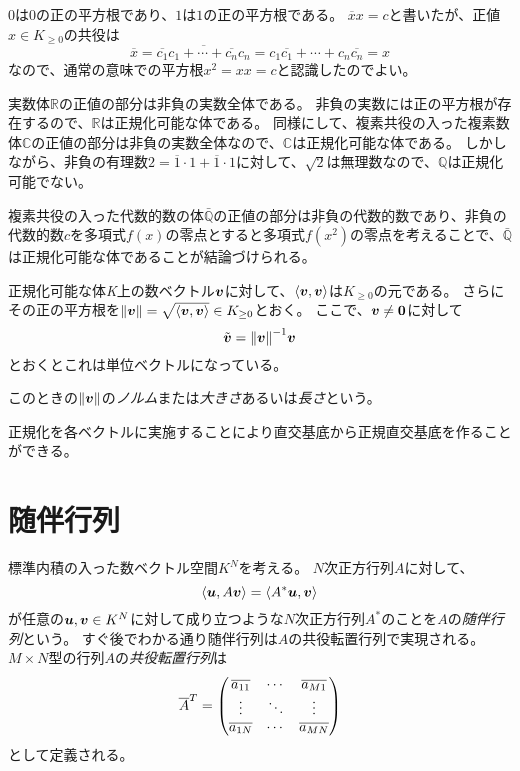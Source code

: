 \begin{remark}
$0$は$0$の正の平方根であり、$1$は$1$の正の平方根である。
$\overline{x}x = c$と書いたが、正値$x \in K_{\ge 0}$の共役は
$$
\overline{x} = \overline{\overline{c_1}c_1+\cdots+\overline{c_n}c_n} = c_1\overline{c_1}+\cdots+c_n\overline{c_n} = x
$$
なので、通常の意味での平方根$x^2 = x x = c$と認識したのでよい。
\end{remark}

\begin{example}
実数体$\mathbb{R}$の正値の部分は非負の実数全体である。
非負の実数には正の平方根が存在するので、$\mathbb{R}$は正規化可能な体である。
同様にして、複素共役の入った複素数体$\mathbb{C}$の正値の部分は非負の実数全体なので、$\mathbb{C}$は正規化可能な体である。
しかしながら、非負の有理数$2 = \overline{1}\cdot 1+\overline{1}\cdot 1$に対して、$\sqrt{2}$は無理数なので、$\mathbb{Q}$は正規化可能でない。
\end{example}

\begin{example}
複素共役の入った代数的数の体$\bar{\mathbb{Q}}$の正値の部分は非負の代数的数であり、非負の代数的数$c$を多項式$f(x)$の零点とすると多項式$f(x^2)$の零点を考えることで、$\bar{\mathbb{Q}}$は正規化可能な体であることが結論づけられる。
\end{example}

\begin{proposition}[正規化]
正規化可能な体\emph{K}上の数ベクトル$\vb*{v}$に対して、$\langle\vb*{v}, \vb*{v}\rangle$は$K_{\ge 0}$の元である。
さらにその正の平方根を$\norm{\vb*{v}} = \sqrt{\langle\vb*{v}, \vb*{v}\rangle} \in K_{\ge 0}$とおく。
ここで、$\vb*{v} \ne \vb*{0}$に対して
$$
\tilde{\vb*{v}} = \norm{\vb*{v}}^{-1}\vb*{v}
$$
とおくとこれは単位ベクトルになっている。
\end{proposition}

このときの$\norm{\vb*{v}}$の\emph{ノルム}または\emph{大きさ}あるいは\emph{長さ}という。

正規化を各ベクトルに実施することにより直交基底から正規直交基底を作ることができる。

\section{随伴行列}

標準内積の入った数ベクトル空間$K^N$を考える。
$N$次正方行列$A$に対して、
$$
\langle\vb*{u}, A\vb*{v}\rangle = \langle A^*\vb*{u}, \vb*{v}\rangle
$$
が任意の$\vb*{u}, \vb*{v} \in K^N$に対して成り立つような$N$次正方行列$A^*$のことを$A$の\emph{随伴行列}という。
すぐ後でわかる通り随伴行列は$A$の共役転置行列で実現される。
$M\times N$型の行列$A$の\emph{共役転置行列}は
$$
\overline{A}^T = \mqty(\overline{a_{1 1}} & \cdots & \overline{a_{M 1}} \\ \vdots & \ddots & \vdots \\ \overline{a_{1 N}} & \cdots & \overline{a_{M N}})
$$
として定義される。

